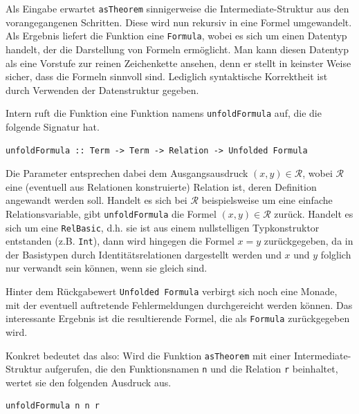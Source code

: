 Als Eingabe erwartet \texttt{asTheorem} sinnigerweise die Intermediate-Struktur aus den vorangegangenen Schritten. Diese wird
nun rekursiv in eine Formel umgewandelt. Als Ergebnis liefert die Funktion eine \texttt{Formula}, wobei es sich um einen
Datentyp handelt, der die Darstellung von Formeln ermöglicht. Man kann diesen Datentyp als eine Vorstufe zur reinen
Zeichenkette ansehen, denn er stellt in keinster Weise sicher, dass die Formeln sinnvoll sind. Lediglich syntaktische Korrektheit
ist durch Verwenden der Datenstruktur gegeben.


Intern ruft die Funktion eine Funktion namens \texttt{unfoldFormula} auf, die die folgende Signatur hat.

\begin{verbatim}
unfoldFormula :: Term -> Term -> Relation -> Unfolded Formula
\end{verbatim}

Die Parameter entsprechen dabei dem Ausgangsausdruck $(x, y) \in \mathcal{R}$, wobei $\mathcal{R}$ eine (eventuell aus
Relationen konstruierte) Relation ist, deren Definition angewandt werden soll. Handelt es sich bei $\mathcal{R}$ beispielsweise
um eine einfache Relationsvariable, gibt \texttt{unfoldFormula} die Formel $(x, y) \in \mathcal{R}$ zurück. Handelt es sich
um eine \texttt{RelBasic}, d.h. sie ist aus einem nullstelligen Typkonstruktor entstanden (z.B. \texttt{Int}), dann wird hingegen
die Formel $x = y$ zurückgegeben, da in der Basistypen durch Identitätsrelationen dargestellt werden und $x$ und $y$ folglich
nur verwandt sein können, wenn sie gleich sind.

Hinter dem Rückgabewert \texttt{Unfolded Formula} verbirgt sich noch eine Monade, mit der eventuell auftretende Fehlermeldungen
durchgereicht werden können. Das interessante Ergebnis ist die resultierende Formel, die als \texttt{Formula} zurückgegeben wird.

Konkret bedeutet das also: Wird die Funktion \texttt{asTheorem} mit einer Intermediate-Struktur aufgerufen, die den
Funktionsnamen \texttt{n} und die Relation \texttt{r} beinhaltet, wertet sie den folgenden Ausdruck aus.

\begin{verbatim}
unfoldFormula n n r
\end{verbatim}

